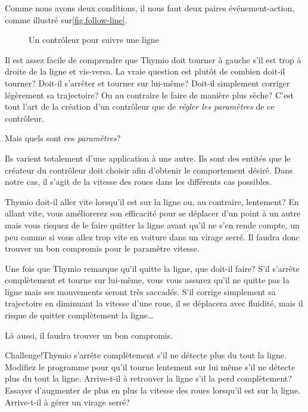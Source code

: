 Comme nous avons deux conditions, il nous faut deux paires événement-action, comme illustré sur\cref{fig.follow-line}.

\begin{figure}[h]
    \centering
    \hspace{1cm}
    \caption{Un contrôleur pour suivre une ligne}
\end{figure}


Il est assez facile de comprendre que Thymio doit tourner à gauche s'il est trop à droite de la ligne et vis-versa. La vraie question est plutôt de combien doit-il tourner? Doit-il s'arrêter et tourner sur lui-même? Doit-il simplement corriger légèrement sa trajectoire? Ou au contraire le faire de manière plus sèche? C'est tout l'art de la création d'un contrôleur que de \textit{régler les paramètres} de ce contrôleur.

Mais quels sont ces \textit{paramètres}?

Ils varient totalement d'une application à une autre. Ils sont des entités que le créateur du contrôleur doit choisir afin d'obtenir le comportement désiré. Dans notre cas, il s'agit de la vitesse des roues dans les différents cas possibles. 

Thymio doit-il aller vite lorsqu'il est sur la ligne ou, au contraire, lentement? En allant vite, vous améliorerez son efficacité pour se déplacer d'un point à un autre mais vous risquez de le faire quitter la ligne avant qu'il ne s'en rende compte, un peu comme si vous allez trop vite en voiture dans un virage serré. Il faudra donc trouver un bon compromis pour le paramètre vitesse.

Une fois que Thymio remarque qu'il quitte la ligne, que doit-il faire? S'il s'arrête complètement et tourne sur lui-même, vous vous assurez qu'il ne quitte pas la ligne mais ses mouvements seront très saccadés. S'il corrige simplement sa trajectoire en diminuant la vitesse d'une roue, il se déplacera avec fluidité, mais il risque de quitter complètement la ligne\ldots 

Là aussi, il faudra trouver un bon compromis.

\begin{bclogo}[couleur = pink!30, arrondi = 0.1, logo = \bccrayon, ombre = true]{Challenge!}Thymio s'arrête complètement s'il ne détecte plus du tout la ligne. Modifiez le programme pour qu'il tourne lentement sur lui même s'il ne détecte plus du tout la ligne. Arrive-t-il à retrouver la ligne s'il la perd complètement? Essayer d'augmenter de plus en plus la vitesse des roues lorsqu'il est sur la ligne. Arrive-t-il à gérer un virage serré?
\end{bclogo}


